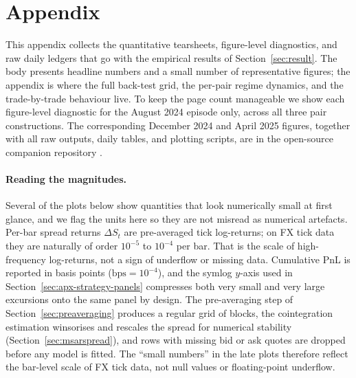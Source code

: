 \section{Appendix}\label{sec:appendix}

This appendix collects the quantitative tearsheets, figure-level diagnostics, and raw daily ledgers that go with the empirical results of Section~\ref{sec:result}. The body presents headline numbers and a small number of representative figures; the appendix is where the full back-test grid, the per-pair regime dynamics, and the trade-by-trade behaviour live. To keep the page count manageable we show each figure-level diagnostic for the August 2024 episode only, across all three pair constructions. The corresponding December 2024 and April 2025 figures, together with all raw outputs, daily tables, and plotting scripts, are in the open-source companion repository \parencite{furnes2026repo}.

\paragraph{Reading the magnitudes.} Several of the plots below show quantities that look numerically small at first glance, and we flag the units here so they are not misread as numerical artefacts. Per-bar spread returns $\Delta S_t$ are pre-averaged tick log-returns; on FX tick data they are naturally of order $10^{-5}$ to $10^{-4}$ per bar. That is the scale of high-frequency log-returns, not a sign of underflow or missing data. Cumulative PnL is reported in basis points ($\text{bps} = 10^{-4}$), and the symlog $y$-axis used in Section~\ref{sec:apx-strategy-panels} compresses both very small and very large excursions onto the same panel by design. The pre-averaging step of Section~\ref{sec:preaveraging} produces a regular grid of blocks, the cointegration estimation winsorises and rescales the spread for numerical stability (Section~\ref{sec:msarspread}), and rows with missing bid or ask quotes are dropped before any model is fitted. The ``small numbers'' in the late plots therefore reflect the bar-level scale of FX tick data, not null values or floating-point underflow.

